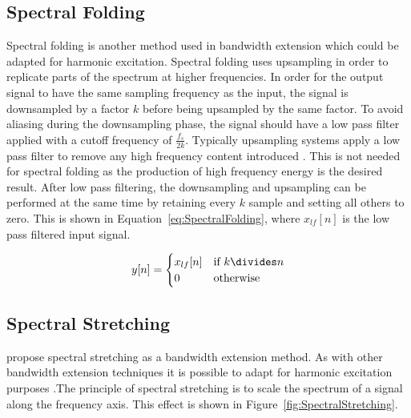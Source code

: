 	\subsection{Spectral Folding}
	\label{sec:Excitation-Methods-SpectralFolding}
		Spectral folding is another method used in bandwidth extension \citep{friedrich2007spectral} which could be
		adapted for harmonic excitation. Spectral folding uses upsampling in order to replicate parts of the
		spectrum at higher frequencies. In order for the output signal to have the same sampling frequency as the
		input, the signal is downsampled by a factor $k$ before being upsampled by the same factor. To avoid
		aliasing during the downsampling phase, the signal should have a low pass filter applied with a cutoff
		frequency of $\frac{f_{s}}{2k}$. Typically upsampling systems apply a low pass filter to remove any high
		frequency content introduced \citep{oppenheim2014discrete}. This is not needed for spectral folding as the
		production of high frequency energy is the desired result. After low pass filtering, the downsampling and
		upsampling can be performed at the same time by retaining every $k$ sample and setting all others
		to zero. This is shown in Equation~\ref{eq:SpectralFolding}, where $x_{lf}[n]$ is the low pass filtered
		input signal.

		\begin{equation}
			y[n] = \begin{cases}
				x_{lf}[n] & \text{if $k \divides n$} \\
				0 & \text{otherwise}
			\end{cases}
			\label{eq:SpectralFolding}
		\end{equation}

	\subsection{Spectral Stretching}
	\label{sec:Excitation-Methods-SpectralStretching}
		\citet{nagel2009a} propose spectral stretching as a bandwidth extension method. As with other bandwidth
		extension techniques it is possible to adapt for harmonic excitation purposes .The principle of spectral
		stretching is to scale the spectrum of a signal along the frequency axis. This effect is shown in
		Figure~\ref{fig:SpectralStretching}.

